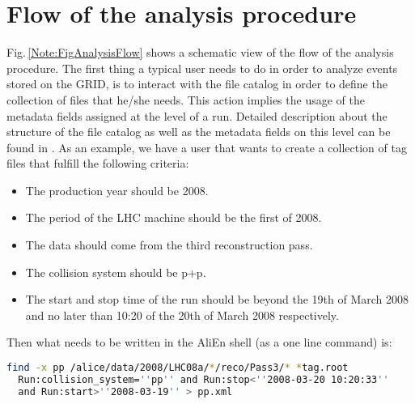 \section{Flow of the analysis procedure}
\label{Note:FLOW}

Fig.\,\ref{Note:FigAnalysisFlow} shows a schematic view of the flow of the analysis procedure. The first thing a typical user needs to do in order to analyze events stored on the GRID, is to interact with the file catalog in order to define the collection of files that he/she needs. This action implies the usage of the metadata fields assigned at the level of a run. Detailed description about the structure of the file catalog as well as the metadata fields on this level can be found in \cite{Note:RefFileCatalogMetadataNote,Note:RefFileCatalogMetadataWeb}. As an example, we have a user that wants to create a collection of tag files that fulfill the following criteria:

\begin{itemize}
\item The production year should be 2008.
\item The period of the LHC machine should be the first of 2008.
\item The data should come from the third reconstruction pass.
\item The collision system should be p+p.
\item The start and stop time of the run should be beyond the 19th of March 2008 and no later than 10:20 of the 20th of March 2008 respectively.
\end{itemize}

\noindent Then what needs to be written in the AliEn shell \cite{Note:RefFileCatalogMetadataWeb} (as a one line command) is:

\begin{lstlisting}[language=sh]
  find -x pp /alice/data/2008/LHC08a/*/reco/Pass3/* *tag.root 
  Run:collision_system=''pp'' and Run:stop<''2008-03-20 10:20:33'' 
  and Run:start>''2008-03-19'' > pp.xml
\end{lstlisting}

